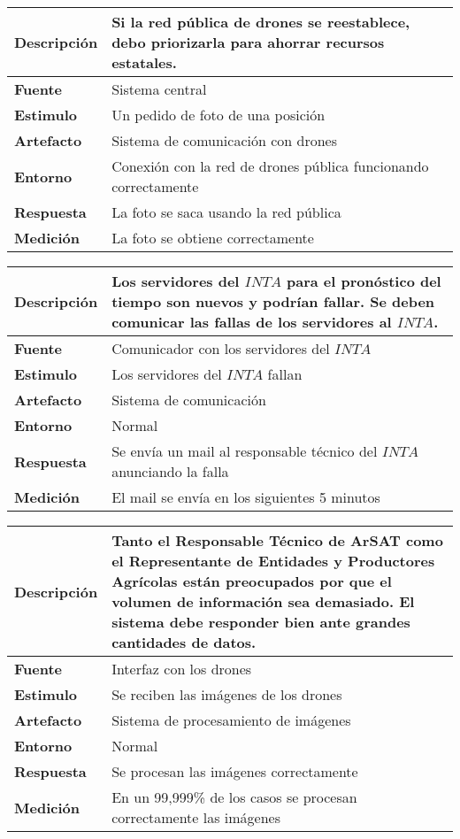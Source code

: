 \begin{tabular}{| l || p{12cm} |}
\hline 
\textbf{Descripci\'on} & Si la red pública de drones se reestablece, debo priorizarla para ahorrar recursos estatales. \\
\hline 
\textbf{Fuente} & Sistema central \\
\hline 
\textbf{Estimulo} & Un pedido de foto de una posición \\
\hline 
\textbf{Artefacto} & Sistema de comunicación con drones \\
\hline 
\textbf{Entorno} & Conexión con la red de drones pública funcionando correctamente \\
\hline 
\textbf{Respuesta} & La foto se saca usando la red pública \\
\hline 
\textbf{Medici\'on} & La foto se obtiene correctamente \\
\hline 
\end{tabular}

\medskip

\begin{tabular}{| l || p{12cm} |}
\hline 
\textbf{Descripci\'on} & Los servidores del $INTA$ para el pronóstico del tiempo son nuevos y podr\'ian fallar. Se deben comunicar las fallas de los servidores al $INTA$. \\
\hline 
\textbf{Fuente} & Comunicador con los servidores del $INTA$\\
\hline 
\textbf{Estimulo} & Los servidores del $INTA$ fallan\\
\hline 
\textbf{Artefacto} & Sistema de comunicación \\
\hline 
\textbf{Entorno} & Normal \\
\hline 
\textbf{Respuesta} & Se envía un mail al responsable técnico del $INTA$ anunciando la falla \\
\hline 
\textbf{Medici\'on} & El mail se envía en los siguientes 5 minutos \\
\hline 
\end{tabular}

\medskip

\begin{tabular}{| l || p{12cm} |}
\hline 
\textbf{Descripci\'on} & Tanto el Responsable T\'ecnico de ArSAT como el Representante de Entidades y Productores Agr\'icolas están preocupados por que el volumen de informaci\'on sea demasiado. El sistema debe responder bien ante grandes cantidades de datos. \\
\hline 
\textbf{Fuente} & Interfaz con los drones \\
\hline 
\textbf{Estimulo} & Se reciben las imágenes de los drones \\
\hline 
\textbf{Artefacto} & Sistema de procesamiento de imágenes \\
\hline 
\textbf{Entorno} & Normal \\
\hline 
\textbf{Respuesta} & Se procesan las imágenes correctamente \\
\hline 
\textbf{Medici\'on} & En un 99,999\% de los casos se procesan correctamente las imágenes \\
\hline 
\end{tabular}


